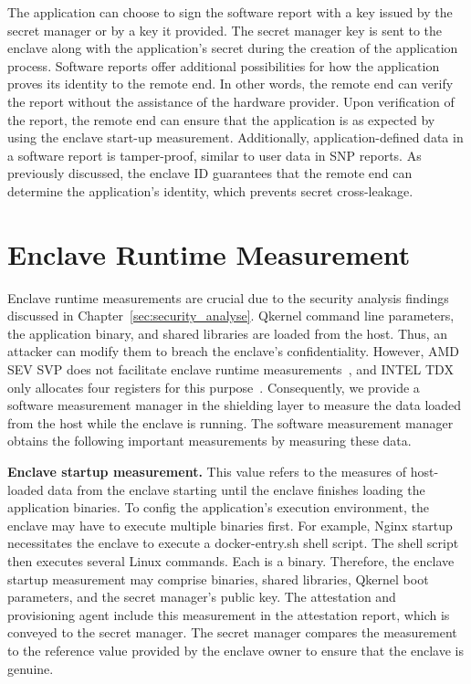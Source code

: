 The application can choose to sign the software report with a key issued by the secret manager or by a key it provided. The secret manager key is sent to the enclave along with the application's secret during the creation of the application process. 
Software reports offer additional possibilities for how the application proves its identity to the remote end. In other words, the remote end can verify the report without the assistance of the hardware provider. Upon verification of the report, 
the remote end can ensure that the application is as expected by using the enclave start-up measurement. Additionally, application-defined data in a software report is tamper-proof, similar to user data in SNP reports. As previously discussed, the 
enclave ID guarantees that the remote end can determine the application's identity, which prevents secret cross-leakage.



\section{Enclave Runtime Measurement}
\label{sec:Enclave_Runtime_Measurement}
Enclave runtime measurements are crucial due to the security analysis findings discussed in Chapter~\ref{sec:security_analyse}. Qkernel command line parameters, the application binary, and shared libraries are loaded from the host. Thus, an attacker can modify them 
to breach the enclave's confidentiality. However, AMD SEV SVP does not facilitate enclave runtime measurements~\cite*{snp_firmware}, and INTEL TDX only allocates four registers for this purpose~\cite*{Intel_tdx_whitepaper}. Consequently, we provide a software measurement manager in the shielding 
layer to measure the data loaded from the host while the enclave is running. The software measurement manager obtains the following important measurements by measuring these data.

\textbf{Enclave startup measurement.} This value refers to the measures of host-loaded data from the enclave starting until the enclave finishes loading the application binaries. To config the application's execution environment, the enclave may have to 
execute multiple binaries first. For example, Nginx startup necessitates the enclave to execute a docker-entry.sh shell script\cite*{nginx}. The shell script then executes several Linux commands. Each is a binary. Therefore, the enclave startup measurement may 
comprise binaries, shared libraries, Qkernel boot parameters, and the secret manager's public key. The attestation and provisioning agent include this measurement in the attestation report, which is conveyed to the secret manager. The secret manager 
compares the measurement to the reference value provided by the enclave owner to ensure that the enclave is genuine.

